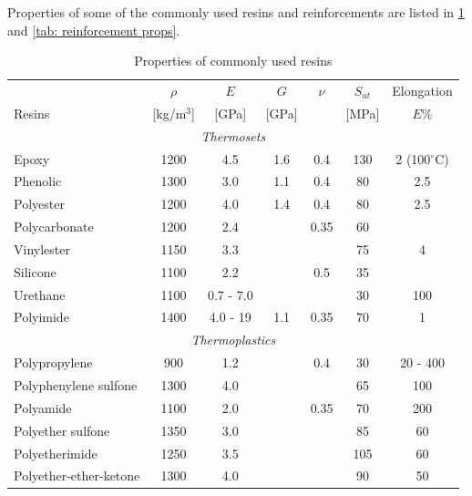 \documentclass[
10pt,
a4paper,
openany,
svgnames,
]{book}
\begin{document}
Properties of some of the commonly used resins and reinforcements are listed in
\cref{tab: resin props} and \cref{tab: reinforcement props}.

\begin{table}[h]
  \centering
  \begin{tabular}{lcccccc}
    \toprule
          & $\rho$         & $E$ & $G$ & $\nu$ & $S_{ut}$ & Elongation \\
    Resins & {[}kg/m$^3${]} & {[}GPa{]} & {[}GPa{]} &       & {[}MPa{]}      & $E\%$ \\
    \midrule
    \multicolumn{7}{c}{\emph{Thermosets}} \\
    Epoxy         & 1200 & 4.5          & 1.6 & 0.4  & 130 & 2 (100$^{\circ}$C) \\
    Phenolic      & 1300 & 3.0          & 1.1 & 0.4  & 80  & 2.5 \\
    Polyester     & 1200 & 4.0          & 1.4 & 0.4  & 80  & 2.5 \\
    Polycarbonate & 1200 & 2.4          &     & 0.35 & 60  & \\
    Vinylester    & 1150 & 3.3          &     &      & 75  & 4 \\
    Silicone      & 1100 & 2.2          &     & 0.5  & 35  & \\
    Urethane      & 1100 & 0.7 - 7.0    &     &      & 30  & 100 \\
    Polyimide     & 1400 & 4.0 - 19     & 1.1 & 0.35 & 70  & 1 \\
    \multicolumn{7}{c}{\emph{Thermoplastics}} \\
    Polypropylene          & 900  & 1.2 & & 0.4  & 30  & 20 - 400 \\
    Polyphenylene sulfone  & 1300 & 4.0 & &      & 65  & 100 \\
    Polyamide              & 1100 & 2.0 & & 0.35 & 70  & 200 \\
    Polyether sulfone      & 1350 & 3.0 & &      & 85  & 60 \\
    Polyetherimide         & 1250 & 3.5 & &      & 105 & 60 \\
    Polyether-ether-ketone & 1300 & 4.0 & &      & 90  & 50 \\
    \bottomrule
  \end{tabular}
  \caption{Properties of commonly used resins \cite{gay2014composite}}
  \label{tab: resin props}
\end{table}
\end{document}
